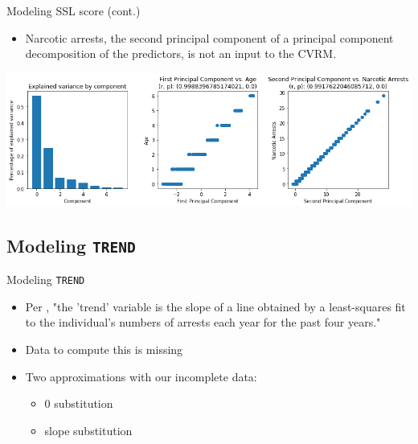 \documentclass{beamer}
\begin{document}
\begin{frame}{Modeling SSL score (cont.)}
\begin{itemize}
    \item Narcotic arrests, the second principal component of a principal component decomposition of the predictors, is not an input to the CVRM.
\end{itemize}
\begin{center}
\includegraphics[scale=.4]{pca.png}
\end{center}
\end{frame}


\subsection{Modeling \texttt{TREND}}

\begin{frame}{Modeling \texttt{TREND}}
\begin{itemize}
    \item Per \cite{factsheet}, "the 'trend' variable is the slope of a line obtained by a least-squares fit to the individual’s numbers of arrests each year for the past four years."
    \item Data to compute this is missing
    \item Two approximations with our incomplete data:
        \begin{itemize}
            \item 0 substitution
            \item slope substitution
        \end{itemize}
\end{itemize}
\end{frame}
\end{document}
